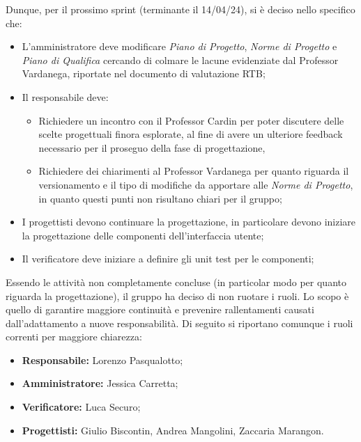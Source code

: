 \noindent Dunque, per il prossimo sprint (terminante il 14/04/24), si è deciso nello specifico che:
\begin{itemize}
    \item L'amministratore deve modificare \textit{Piano di Progetto}, \textit{Norme di Progetto} e \textit{Piano di Qualifica} cercando di colmare le lacune evidenziate dal Professor Vardanega, riportate nel documento di valutazione RTB;
    \item Il responsabile deve:
        \begin{itemize}
            \item Richiedere un incontro con il Professor Cardin per poter discutere delle scelte progettuali finora esplorate, al fine di avere un ulteriore feedback necessario per il proseguo della fase di progettazione,
            \item Richiedere dei chiarimenti al Professor Vardanega per quanto riguarda il versionamento e il tipo di modifiche da apportare alle \textit{Norme di Progetto}, in quanto questi punti non risultano chiari per il gruppo;
        \end{itemize}
    \item I progettisti devono continuare la progettazione, in particolare devono iniziare la progettazione delle componenti dell'interfaccia utente;
    \item Il verificatore deve iniziare a definire gli unit test per le componenti;
\end{itemize}
\bigskip

\noindent Essendo le attività non completamente concluse (in particolar modo per quanto riguarda la progettazione), il gruppo ha deciso di non ruotare i ruoli. Lo scopo è quello di garantire maggiore continuità e prevenire rallentamenti causati dall'adattamento a nuove responsabilità.
Di seguito si riportano comunque i ruoli correnti per maggiore chiarezza:
\begin{itemize}
    \item \textbf{Responsabile:} Lorenzo Pasqualotto;
    \item \textbf{Amministratore:} Jessica Carretta;
    \item \textbf{Verificatore:} Luca Securo;
    \item \textbf{Progettisti:} Giulio Biscontin, Andrea Mangolini, Zaccaria Marangon.
\end{itemize}
